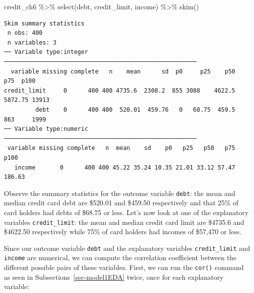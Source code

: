 \documentclass[
  letterpaper,
  DIV=11,
  numbers=noendperiod]{scrreprt}
\newenvironment{Shaded}{\begin{snugshade}}{\end{snugshade}}
\newcommand{\FunctionTok}[1]{\textcolor[rgb]{0.28,0.35,0.67}{#1}}
\newcommand{\NormalTok}[1]{\textcolor[rgb]{0.00,0.23,0.31}{#1}}
\newcommand{\SpecialCharTok}[1]{\textcolor[rgb]{0.37,0.37,0.37}{#1}}
\theoremstyle{definition}
\theoremstyle{remark}
\begin{document}
\begin{Shaded}
\begin{Highlighting}[]
\NormalTok{credit\_ch6 }\SpecialCharTok{\%\textgreater{}\%} 
  \FunctionTok{select}\NormalTok{(debt, credit\_limit, income) }\SpecialCharTok{\%\textgreater{}\%} 
  \FunctionTok{skim}\NormalTok{()}
\end{Highlighting}
\end{Shaded}

\begin{verbatim}
Skim summary statistics
 n obs: 400 
 n variables: 3 
── Variable type:integer ───────────────────────────────────────────────────────
  variable missing complete   n    mean      sd  p0     p25    p50     p75  p100
credit_limit     0      400 400 4735.6  2308.2  855 3088    4622.5 5872.75 13913
         debt    0      400 400  520.01  459.76   0   68.75  459.5  863     1999
── Variable type:numeric ───────────────────────────────────────────────────────
 variable missing complete   n  mean    sd    p0   p25   p50   p75   p100
   income       0      400 400 45.22 35.24 10.35 21.01 33.12 57.47 186.63
\end{verbatim}

Observe the summary statistics for the outcome variable \texttt{debt}:
the mean and median credit card debt are \$520.01 and \$459.50
respectively and that 25\% of card holders had debts of \$68.75 or less.
Let's now look at one of the explanatory variables
\texttt{credit\_limit}: the mean and median credit card limit are
\$4735.6 and \$4622.50 respectively while 75\% of card holders had
incomes of \$57,470 or less.

Since our outcome variable \texttt{debt} and the explanatory variables
\texttt{credit\_limit} and \texttt{income} are numerical, we can compute
the correlation coefficient between the different possible pairs of
these variables. First, we can run the \texttt{cor()} command as seen in
Subsections~\ref{sec-model1EDA} twice, once for each explanatory
variable:

\begin{Shaded}
\end{Shaded}
\end{document}
